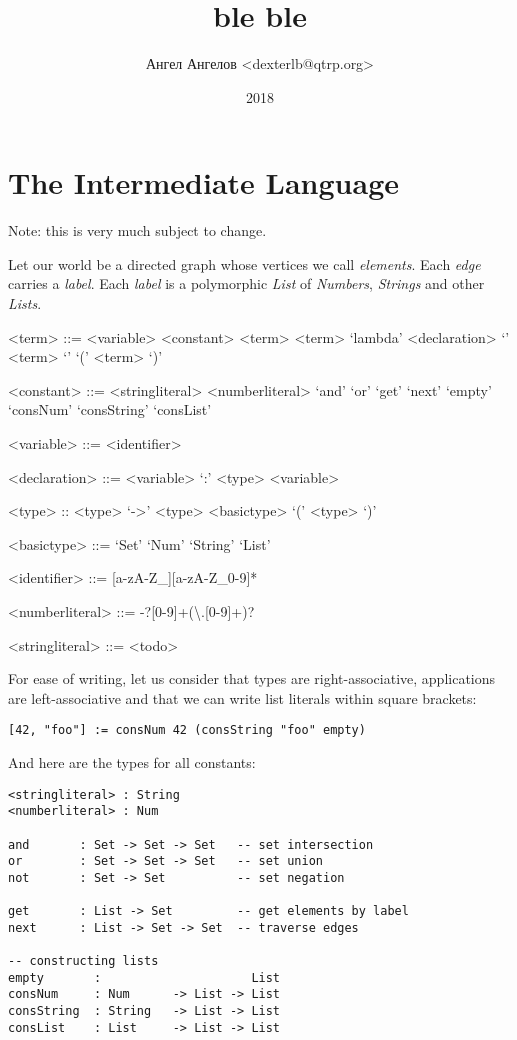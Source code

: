 \documentclass[12pt]{extarticle}
\title{ble ble}
\author{Ангел Ангелов <dexterlb@qtrp.org>}
\date{2018}
\begin{document}

\section{The Intermediate Language}
Note: this is very much subject to change.

Let our world be a directed graph whose vertices we call \emph{elements}.
Each \emph{edge} carries a \emph{label}. Each \emph{label} is a polymorphic
\emph{List} of \emph{Numbers}, \emph{Strings} and other \emph{Lists}.

\begin{grammar}

<term> ::= <variable>
\alt <constant>
\alt <term> <term>
\alt `lambda' <declaration> `{' <term> `}'
\alt `(' <term> `)'

<constant> ::= <stringliteral>
          \alt <numberliteral>
          \alt `and'
          \alt `or'
          \alt `get'
          \alt `next'
          \alt `empty'
          \alt `consNum'
          \alt `consString'
          \alt `consList'


<variable> ::= <identifier>

<declaration> ::= <variable> `:' <type>
\alt <variable>

<type> :: <type> `->' <type>
\alt <basictype>
\alt `(' <type> `)'

<basictype> ::= `Set'
\alt `Num'
\alt `String'
\alt `List'

<identifier> ::= [a-zA-Z_][a-zA-Z_0-9]*

<numberliteral>     ::= -?[0-9]+(\textbackslash.[0-9]+)?

<stringliteral>     ::= <todo>
\end{grammar}

For ease of writing, let us consider that types are right-associative,
applications are left-associative and that we can write list literals
within square brackets:
\begin{lstlisting}
[42, "foo"] := consNum 42 (consString "foo" empty)
\end{lstlisting}

And here are the types for all constants:

\begin{lstlisting}
<stringliteral> : String
<numberliteral> : Num

and       : Set -> Set -> Set   -- set intersection
or        : Set -> Set -> Set   -- set union
not       : Set -> Set          -- set negation

get       : List -> Set         -- get elements by label
next      : List -> Set -> Set  -- traverse edges

-- constructing lists
empty       :                     List
consNum     : Num      -> List -> List
consString  : String   -> List -> List
consList    : List     -> List -> List

\end{lstlisting}
\end{document}
